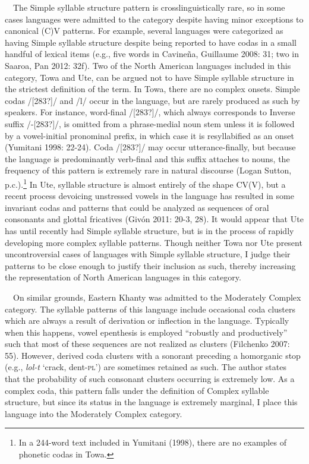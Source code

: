 \documentclass[12pt]{article}
\newenvironment{styleBody}{\renewcommand\baselinestretch{1.0}\setlength\leftskip{0in}\setlength\rightskip{0in plus 1fil}\setlength\parindent{0in}\setlength\parfillskip{0pt plus 1fil}\setlength\parskip{0in plus 1pt}\writerlistparindent\writerlistleftskip\leavevmode\normalfont\normalsize\fontsize{11pt}{13.2pt}\selectfont\mdseries\upshape\writerlistlabel\ignorespaces}{\unskip\vspace{0in plus 1pt}\par}
\newcommand\writerlistleftskip{}
\newcommand\writerlistparindent{}
\newcommand\writerlistlabel{}
\begin{document}
\begin{styleBody}
\ \ The Simple syllable structure pattern is crosslinguistically rare, so in some cases languages were admitted to the category despite having minor exceptions to canonical (C)V patterns. For example, several languages were categorized as having Simple syllable structure despite being reported to have codas in a small handful of lexical items (e.g., five words in Cavineña, Guillaume 2008: 31; two in Saaroa, Pan 2012: 32f). Two of the North American languages included in this category, Towa and Ute, can be argued not to have Simple syllable structure in the strictest definition of the term. In Towa, there are no complex onsets. Simple codas /[283?]/ and /l/ occur in the language, but are rarely produced as such by speakers. For instance, word-final /[283?]/, which always corresponds to Inverse suffix /-[283?]/, is omitted from a phrase-medial noun stem unless it is followed by a vowel-initial pronominal prefix, in which case it is resyllabified as an onset (Yumitani 1998: 22-24). Coda /[283?]/ may occur utterance-finally, but because the language is predominantly verb-final and this suffix attaches to nouns, the frequency of this pattern is extremely rare in natural discourse (Logan Sutton, p.c.).\footnote{In a 244-word text included in Yumitani (1998), there are no examples of phonetic codas in Towa.} In Ute, syllable structure is almost entirely of the shape CV(V), but a recent process devoicing unstressed vowels in the language has resulted in some invariant codas and patterns that could be analyzed as sequences of oral consonants and glottal fricatives (Givón 2011: 20-3, 28). It would appear that Ute has until recently had Simple syllable structure, but is in the process of rapidly developing more complex syllable patterns. Though neither Towa nor Ute present uncontroversial cases of languages with Simple syllable structure, I judge their patterns to be close enough to justify their inclusion as such, thereby increasing the representation of North American languages in this category. 
\end{styleBody}

\begin{styleBody}
\ \ On similar grounds, Eastern Khanty was admitted to the Moderately Complex category. The syllable patterns of this language include occasional coda clusters which are always a result of derivation or inflection in the language. Typically when this happens, vowel epenthesis is employed “robustly and productively” such that most of these sequences are not realized as clusters (Filchenko 2007: 55). However, derived coda clusters with a sonorant preceding a homorganic stop (e.g., \textit{lol-t} ‘crack, dent-\textsc{pl’}) are sometimes retained as such. The author states that the probability of such consonant clusters occurring is extremely low. As a complex coda, this pattern falls under the definition of Complex syllable structure, but since its status in the language is extremely marginal, I place this language into the Moderately Complex category.
\end{styleBody}
\end{document}

